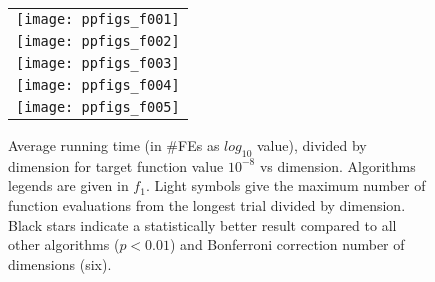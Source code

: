 


    \begin{figure}[h!tb]
        \begin{tabular}
            {c@{\hspace*{-0.00001\textwidth}}
            }
           
        \texttt{[image: ppfigs\_f001]}\\
        \texttt{[image: ppfigs\_f002]}\\

        \texttt{[image: ppfigs\_f003]}\\
        \texttt{[image: ppfigs\_f004]}\\
        
        \texttt{[image: ppfigs\_f005]}\\
        \end{tabular}
        \vspace{-3ex}
         \caption{Average running time (in \#FEs as $log_{10}$ value),
          divided by dimension for target function value $10^{-8}$ vs dimension. 
          Algorithms legends are given in $f_1$. Light symbols give the maximum number of 
          function evaluations from the longest trial divided by dimension. 
          Black stars indicate a statistically better result compared to 
          all other algorithms ($p < 0.01$) and Bonferroni 
          correction number of dimensions (six).}
    \end{figure}  

